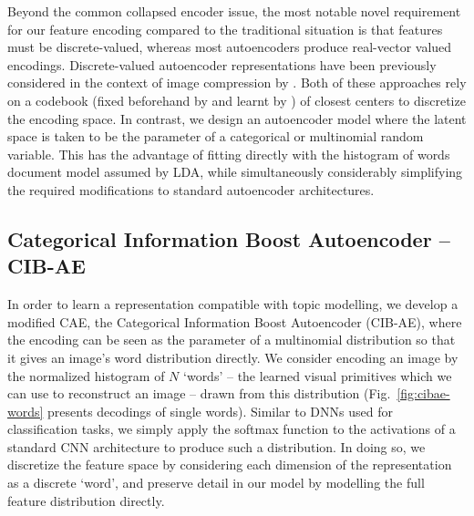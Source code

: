Beyond the common collapsed encoder issue, the most notable novel requirement for our feature encoding compared to the traditional situation is that features must be discrete-valued, whereas most autoencoders produce real-vector valued encodings. Discrete-valued autoencoder representations have been previously considered in the context of image compression by \citep{AgustssonSoftToHardVQ,vqvae2017}. Both of these approaches rely on a codebook (fixed beforehand by \citep{AgustssonSoftToHardVQ} and learnt by \citep{vqvae2017}) of closest centers to discretize the encoding space. In contrast, we design an autoencoder model where the latent space is taken to be the parameter of a categorical or multinomial random variable. This has the advantage of fitting directly with the histogram of words document model assumed by LDA, while simultaneously considerably simplifying the required modifications to standard autoencoder architectures.

\subsection{Categorical Information Boost Autoencoder -- CIB-AE}

In order to learn a representation compatible with topic modelling, we develop a modified CAE, the Categorical Information Boost Autoencoder (CIB-AE), where the encoding can be seen as the parameter of a multinomial distribution so that it gives an image's word distribution directly. We consider encoding an image by the normalized histogram of $N$ `words' -- the learned visual primitives which we can use to reconstruct an image -- drawn from this distribution (Fig.~\ref{fig:cibae-words} presents decodings of single words). Similar to DNNs used for classification tasks, we simply apply the softmax function to the activations of a standard CNN architecture to produce such a distribution. In doing so, we discretize the feature space by considering each dimension of the representation as a discrete `word', and preserve detail in our model by modelling the full feature distribution directly.

